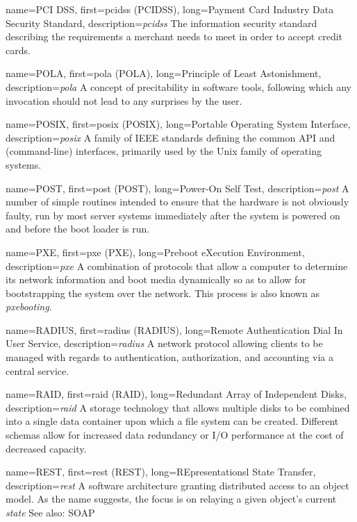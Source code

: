 {
	name={PCI DSS},
	first={\acrlong{pcidss} (PCIDSS)},
	long={Payment Card Industry Data Security Standard},
	description={{\em \acrlong{pcidss}} The
information security standard describing the requirements a merchant needs
to meet in order to accept credit cards.}
}

{
	name={POLA},
	first={\acrlong{pola} (POLA)},
	long={Principle of Least Astonishment},
	description={{\em \acrlong{pola}} A concept of
precitability in software tools, following which any invocation should not
lead to any surprises by the user.}
}

{
	name={POSIX},
	first={\acrlong{posix} (POSIX)},
	long={Portable Operating System Interface},
	description={{\em \acrlong{posix}} A family of IEEE
standards defining the common API and (command-line) interfaces, primarily
used by the Unix family of operating systems.}
}

{
	name={POST},
	first={\acrlong{post} (POST)},
	long={Power-On Self Test},
	description={{\em \acrlong{post}} A number of simple routines intended
to ensure that the hardware is not obviously faulty, run by most server
systems immediately after the system is powered on and before the boot
loader is run.}
}

{
	name={PXE},
	first={\acrlong{pxe} (PXE)},
	long={Preboot eXecution Environment},
	description={{\em \acrlong{pxe}} A combination of protocols
that allow a computer to determine its network information and boot media
dynamically so as to allow for bootstrapping the system over the network.
This process is also known as {\em pxebooting}.}
}

{
	name={RADIUS},
	first={\acrlong{radius} (RADIUS)},
	long={Remote Authentication Dial In User Service},
	description={{\em \acrlong{radius}} A network
protocol allowing clients to be managed with regards to authentication,
authorization, and accounting via a central service.}
}

{
	name={RAID},
	first={\acrlong{raid} (RAID)},
	long={Redundant Array of Independent Disks},
	description={{\em \acrlong{raid}} A storage
technology that allows multiple disks to be combined into a single data
container upon which a file system can be created.  Different schemas allow
for increased data redundancy or I/O performance at the cost of decreased
capacity.}
}

{
	name={REST},
	first={\acrlong{rest} (REST)},
	long={REpresentationsl State Transfer},
	description={{\em \acrlong{rest}} A software architecture
granting distributed access to an object model.  As the name suggests, the
focus is on relaying a given object's current {\em state} See also: SOAP}
}

